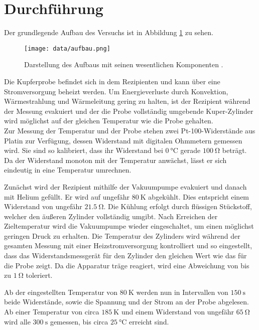 \section{Durchführung}
\label{sec:Durchführung}

Der grundlegende Aufbau des Versuchs ist in Abbildung \ref{fig:aufbau} zu sehen.

\begin{figure}
  \centering
  \texttt{[image: data/aufbau.png]}
  \caption{Darstellung des Aufbaus mit seinen wesentlichen Komponenten \cite{versuchsanleitung}.}
  \label{fig:aufbau}
\end{figure}

Die Kupferprobe befindet sich in dem Rezipienten und kann über eine Stromversorgung beheizt werden. Um Energieverluste durch Konvektion, Wärmestrahlung und Wärmeleitung gering zu halten, ist der Rezipient während der Messung evakuiert und der die Probe vollständig umgebende Kuper-Zylinder wird möglichst auf der gleichen Temperatur wie die Probe gehalten.\\
Zur Messung der Temperatur und der Probe stehen zwei Pt-100-Widerstände aus Platin zur Verfügung, dessen Widerstand mit digitalen Ohmmetern gemessen wird. Sie sind so kalibriert, dass ihr Widerstand bei $\SI{0}{\celsius}$ gerade $\SI{100}{\ohm}$ beträgt. Da der Widerstand monoton mit der Temperatur anwächst, lässt er sich eindeutig in eine Temperatur umrechnen.

Zunächst wird der Rezipient mithilfe der Vakuumpumpe evakuiert und danach mit Helium gefüllt. Er wird auf ungefähr $\SI{80}{\kelvin}$ abgekühlt. Dies entspricht einem Widerstand von ungefähr $\SI{21.5}{\ohm}$. Die Kühlung erfolgt durch flüssigen Stückstoff, welcher den äußeren Zylinder vollständig umgibt. Nach Erreichen der Zieltemperatur wird die Vakuumpumpe wieder eingeschaltet, um einen möglichst geringen Druck zu erhalten. Die Temperatur des Zylinders wird während der gesamten Messung mit einer Heizstromversorgung kontrolliert und so eingestellt, dass das Widerstandsmessgerät für den Zylinder den gleichen Wert wie das für die Probe zeigt. Da die Apparatur träge reagiert, wird eine Abweichung von bis zu $\SI{1}{\ohm}$ toleriert.

Ab der eingestellten Temperatur von $\SI{80}{\kelvin}$ werden nun in Intervallen von $\SI{150}{\second}$ beide Widerstände, sowie die Spannung und der Strom an der Probe abgelesen. Ab einer Temperatur von circa $\SI{185}{\kelvin}$ und einem Widerstand von ungefähr $\SI{65}{\ohm}$ wird alle $\SI{300}{\second}$ gemessen, bis circa $\SI{25}{\celsius}$ erreicht sind.
